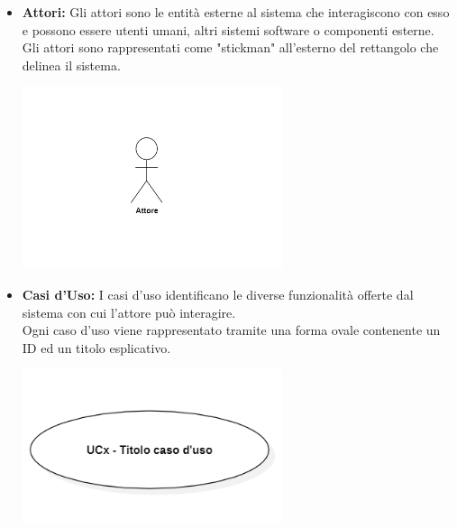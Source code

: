 \begin{itemize}
    \item \textbf{Attori:}
    Gli attori sono le entità esterne al sistema che interagiscono con esso e possono essere utenti umani, altri sistemi software o componenti esterne. \\
    Gli attori sono rappresentati come "stickman" all'esterno del rettangolo che delinea il sistema.
    \begin{minipage}[t]{\linewidth}
        \centering
        \includegraphics[width=0.6\textwidth]{../Images/NormeDiProgetto/Attore.PNG}
    \end{minipage}

    \item \textbf{Casi d'Uso:}
    I casi d'uso identificano le diverse funzionalità offerte dal sistema con cui l'attore può interagire. \\
    Ogni caso d'uso viene rappresentato tramite una forma ovale contenente un ID ed un titolo esplicativo.
    \begin{minipage}[t]{\linewidth}
        \centering
        \includegraphics[width=0.6\textwidth]{../Images/NormeDiProgetto/UC.PNG}
    \end{minipage}


\end{itemize}
